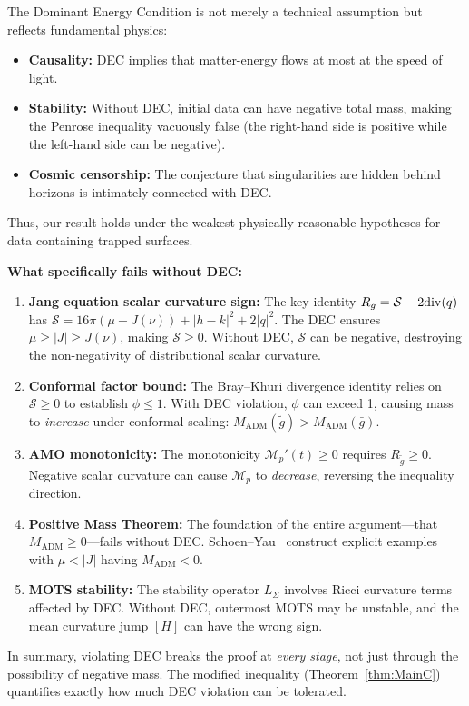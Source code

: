 \begin{remark}\label{rem:DECNecessity}
The Dominant Energy Condition is not merely a technical assumption but reflects fundamental physics:
\begin{itemize}
    \item \textbf{Causality:} DEC implies that matter-energy flows at most at the speed of light.
    \item \textbf{Stability:} Without DEC, initial data can have negative total mass, making the Penrose inequality vacuously false (the right-hand side is positive while the left-hand side can be negative).
    \item \textbf{Cosmic censorship:} The conjecture that singularities are hidden behind horizons is intimately connected with DEC.
\end{itemize}
Thus, our result holds under the weakest physically reasonable hypotheses for data containing trapped surfaces.

\textbf{What specifically fails without DEC:}
\begin{enumerate}
    \item \textbf{Jang equation scalar curvature sign:} The key identity $R_{\bar{g}} = \mathcal{S} - 2\mathrm{div}(q)$ has $\mathcal{S} = 16\pi(\mu - J(\nu)) + |h-k|^2 + 2|q|^2$. The DEC ensures $\mu \ge |J| \ge J(\nu)$, making $\mathcal{S} \ge 0$. Without DEC, $\mathcal{S}$ can be negative, destroying the non-negativity of distributional scalar curvature.
    
    \item \textbf{Conformal factor bound:} The Bray--Khuri divergence identity relies on $\mathcal{S} \ge 0$ to establish $\phi \le 1$. With DEC violation, $\phi$ can exceed 1, causing mass to \emph{increase} under conformal sealing: $M_{\mathrm{ADM}}(\tilde{g}) > M_{\mathrm{ADM}}(\bar{g})$.
    
    \item \textbf{AMO monotonicity:} The monotonicity $\mathcal{M}_p'(t) \ge 0$ requires $R_{\tilde{g}} \ge 0$. Negative scalar curvature can cause $\mathcal{M}_p$ to \emph{decrease}, reversing the inequality direction.
    
    \item \textbf{Positive Mass Theorem:} The foundation of the entire argument---that $M_{\mathrm{ADM}} \ge 0$---fails without DEC. Schoen--Yau~\cite{schoenyau1981} construct explicit examples with $\mu < |J|$ having $M_{\mathrm{ADM}} < 0$.
    
    \item \textbf{MOTS stability:} The stability operator $L_\Sigma$ involves Ricci curvature terms affected by DEC. Without DEC, outermost MOTS may be unstable, and the mean curvature jump $[H]$ can have the wrong sign.
\end{enumerate}
In summary, violating DEC breaks the proof at \emph{every stage}, not just through the possibility of negative mass. The modified inequality (Theorem~\ref{thm:MainC}) quantifies exactly how much DEC violation can be tolerated.
\end{remark}

